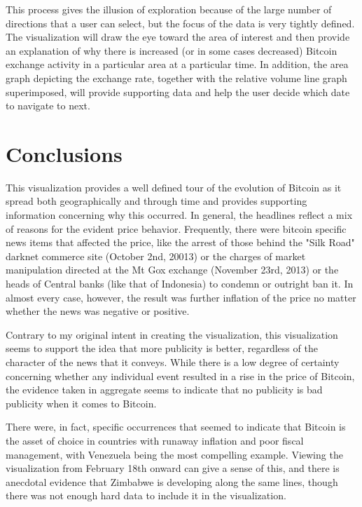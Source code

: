 \documentclass[journal]{vgtc}                %
\begin{document}
This process gives the illusion of exploration because of the large number of directions that a user can select, but the focus of the data is very tightly defined.  The visualization will draw the eye toward the area of interest and then provide an explanation of why there is increased (or in some cases decreased) Bitcoin exchange activity in a particular area at a particular time.  In addition, the area graph depicting the exchange rate, together with the relative volume line graph superimposed, will provide supporting data and help the user decide which date to navigate to next.

\section{Conclusions}
This visualization provides a well defined tour of the evolution of Bitcoin as it spread both geographically and through time and provides supporting information concerning why this occurred.  In general, the headlines reflect a mix of reasons for the evident price behavior.  Frequently, there were bitcoin specific news items that affected the price, like the arrest of those behind the "Silk Road" darknet commerce site\cite{tradeblock-1} (October 2nd, 20013) or the charges of market manipulation directed at the Mt Gox exchange\cite{jsouthurst-1} (November 23rd, 2013) or the heads of Central banks (like that of Indonesia\cite{reuters-1}) to condemn or outright ban it.  In almost every case, however, the result was further inflation of the price no matter whether the news was negative or positive.  

Contrary to my original intent in creating the visualization, this visualization seems to support the idea that more publicity is better, regardless of the character of the news that it conveys.  While there is a low degree of certainty concerning whether any individual event resulted in a rise in the price of Bitcoin, the evidence taken in aggregate seems to indicate that no publicity is bad publicity when it comes to Bitcoin.

There were, in fact, specific occurrences that seemed to indicate that Bitcoin is the asset of choice in countries with runaway inflation and poor fiscal management, with Venezuela being the most compelling example.  Viewing the visualization from February 18th onward can give a sense of this, and there is anecdotal evidence that Zimbabwe is developing along the same lines\cite{bloomberg-1}, though there was not enough hard data to include it in the visualization.
\end{document}
